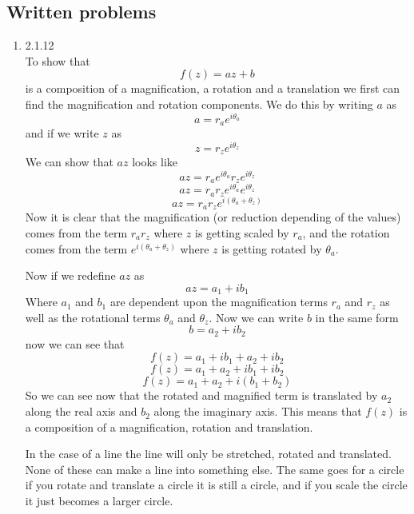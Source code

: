 \documentclass[11pt]{article}
\begin{document}

\subsection*{Written problems}
\begin{enumerate}
\item  2.1.12\\
To show that $$f(z) = az +b$$ is a composition of a magnification, a rotation and a translation we first can find the magnification and rotation components. We do this by writing $a$ as $$a= r_a e^{i\theta_a}$$
and if we write $z$ as 
$$z= r_z e^{i\theta_z}$$
We can show that $az$ looks like
$$az= r_a e^{i\theta_a}r_z e^{i\theta_z}$$
$$az= r_a r_z e^{i\theta_a}e^{i\theta_z}$$
$$az= r_ar_z e^{i(\theta_a+\theta_z)}$$
Now it is clear that the magnification (or reduction depending of the values) comes from the term $r_ar_z$ where $z$ is getting scaled by $r_a$, and the rotation comes from the term $e^{i(\theta_a+\theta_z)}$
where $z$ is getting rotated by $\theta_a$. 

Now if we redefine $az$ as
$$az = a_1 + ib_1$$
Where $a_1$ and $b_1$ are dependent upon the magnification terms $r_a$ and $r_z$ as well as the rotational terms $\theta_a$ and $\theta_z$. Now we can write $b$ in the same form
$$b= a_2 + i b_2$$
now we can see that 
$$f(z) = a_1 +ib_1 +a_2 +ib_2$$
$$f(z) = a_1 +a_2 +ib_1 +ib_2$$
$$f(z) = a_1 +a_2 +i(b_1 +b_2)$$
So we can see now that the rotated and magnified term is translated by $a_2$ along the real axis and $b_2$ along the imaginary axis. This means that $f(z)$ is a composition of a magnification, rotation and translation.

In the case of a line the line will only be stretched, rotated and translated. None of these can make a line into something else. The same goes for a circle if you rotate and translate a circle it is still a circle, and if you scale the circle it just becomes a larger circle.



\end{enumerate}
\end{document}

